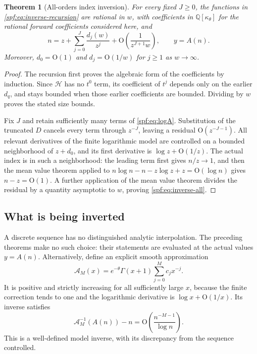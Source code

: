 \documentclass[11pt]{article}
\numberwithin{equation}{section}
\newtheorem{theorem}{Theorem}[section]
\theoremstyle{definition}
\theoremstyle{remark}
\theoremstyle{definition}
\newcommand{\Q}{\mathbb Q}
\newcommand{\bigO}{\mathrm O}
\begin{document}
\begin{theorem}[All-orders index inversion]
\label{spf:thm:inverse-all}
For every fixed $J\ge0$, the functions in \eqref{spf:eq:inverse-recursion} are
rational in $w$, with coefficients in $\Q[\kappa_\theta]$ for the rational
forward coefficients considered here, and
\begin{equation}
 n=z+\sum_{j=0}^{J}\frac{d_j(w)}{z^j}
       +\bigO\left(\frac1{z^{J+1}w}\right),
 \qquad y=A(n).
 \label{spf:eq:inverse-all}
\end{equation}
Moreover, $d_0=\bigO(1)$ and $d_j=\bigO(1/w)$ for $j\ge1$ as $w\to\infty$.
\end{theorem}
\begin{proof}
The recursion first proves the algebraic form of the coefficients by
induction. Since $\mathcal H$ has no $t^0$ term, its coefficient of $t^j$
depends only on the earlier $d_q$, and stays bounded when those earlier
coefficients are bounded. Dividing by $w$ proves the stated size bounds.

Fix $J$ and retain sufficiently many terms of \eqref{spf:eq:logA}. Substitution
of the truncated $D$ cancels every term through $z^{-J}$, leaving a residual
$\bigO(z^{-J-1})$. All relevant derivatives of the finite logarithmic model
are controlled on a bounded neighborhood of $z+d_0$, and its first derivative
is $\log z+\bigO(1/z)$. The actual index is in such a neighborhood: the leading
term first gives $n/z\to1$, and then the mean value theorem applied to
$n\log n-n-z\log z+z=\bigO(\log n)$ gives $n-z=\bigO(1)$.
A further application of the mean value theorem divides the residual by a
quantity asymptotic to $w$, proving \eqref{spf:eq:inverse-all}.
\end{proof}

\subsection{What is being inverted}

A discrete sequence has no distinguished analytic interpolation. The preceding
theorems make no such choice: their statements are evaluated at the actual
values $y=A(n)$. Alternatively, define an explicit smooth approximation
\begin{equation}
 \mathcal A_M(x)=e^{-\theta}\Gamma(x+1)\sum_{j=0}^{M}c_jx^{-j}.
\end{equation}
It is positive and strictly increasing for all sufficiently large $x$, because
the finite correction tends to one and the logarithmic derivative is
$\log x+\bigO(1/x)$. Its inverse satisfies
\begin{equation}
 \mathcal A_M^{-1}(A(n))-n
 =\bigO\left(\frac{n^{-M-1}}{\log n}\right).
\end{equation}
This is a well-defined model inverse, with its discrepancy from the sequence
controlled.
\end{document}
